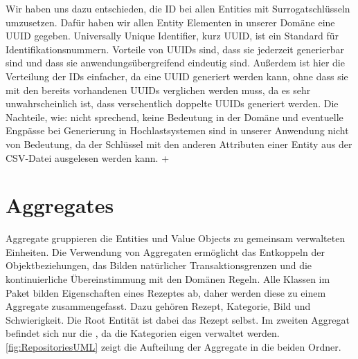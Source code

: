 Wir haben uns dazu entschieden, die ID bei allen Entities mit Surrogatschlüsseln umzusetzen. Dafür haben wir allen Entity Elementen in unserer Domäne eine UUID gegeben. Universally Unique Identifier, kurz UUID, ist ein Standard für Identifikationsnummern. Vorteile von UUIDs sind, dass sie jederzeit generierbar sind und dass sie anwendungsübergreifend eindeutig sind. Außerdem ist hier die Verteilung der IDs einfacher, da eine UUID generiert werden kann, ohne dass sie mit den bereits vorhandenen UUIDs verglichen werden muss, da es sehr unwahrscheinlich ist, dass versehentlich doppelte UUIDs generiert werden. Die Nachteile, wie: nicht sprechend, keine Bedeutung in der Domäne und eventuelle Engpässe bei Generierung in
Hochlastsystemen sind in unserer Anwendung nicht von Bedeutung, da der Schlüssel mit den anderen Attributen einer Entity aus der CSV-Datei ausgelesen werden kann.
+
\section{Aggregates}
Aggregate gruppieren die Entities und Value Objects zu gemeinsam verwalteten Einheiten. Die Verwendung von Aggregaten ermöglicht das Entkoppeln der Objektbeziehungen, das Bilden natürlicher Transaktionsgrenzen und die kontinuierliche Übereinstimmung mit den Domänen Regeln.
Alle Klassen im Paket \href{https://github.com/MichaelaHaag/RezeptApp/tree/main/3-Domain-Code/src/main/java/de/rezeptapp/domain/Rezept}{} bilden Eigenschaften eines Rezeptes ab, daher werden diese zu einem Aggregate zusammengefasst. Dazu gehören Rezept, Kategorie, Bild und Schwierigkeit. Die Root Entität ist dabei das Rezept selbst. Im zweiten Aggregat befindet sich nur die \href{https://github.com/MichaelaHaag/RezeptApp/tree/main/3-Domain-Code/src/main/java/de/rezeptapp/domain/Kategorie}{}, da die Kategorien eigen verwaltet werden. \autoref{fig:RepositoriesUML} zeigt die Aufteilung der Aggregate in die beiden Ordner. 

